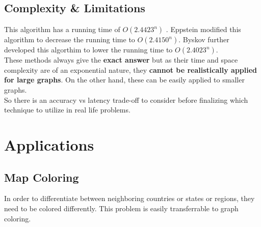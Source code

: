 \documentclass[14pt]{extreport}
\begin{document}
	\section{Complexity \& Limitations}
	    \vspace{20pt}
	    This algorithm has a running time of $O(2.4423^n)$ \cite{article}. Eppstein \cite{DBLP:journals/corr/cs-DS-0011009} modified  this algorithm to decrease the running time to $O(2.4150^n)$. Byskov \cite{Byskov} further developed this algorthim to lower the running time to $O(2.4023^n)$. \\
	    
	    These methods always give the \textbf{exact answer} but as their time and space complexity are of an exponential nature, they \textbf{cannot be realistically applied for large graphs}. On the other hand, these can be easily applied to smaller graphs.\\
	    
	    So there is an accuracy vs latency trade-off to consider before finalizing which technique to utilize in real life problems.
	
	\pagebreak
	
	\chapter{Applications}
	
    	\section{Map Coloring}
    	    In order to differentiate between neighboring countries or states or regions, they need to be colored differently. This problem is easily transferrable to graph coloring.
    	
\end{document}
